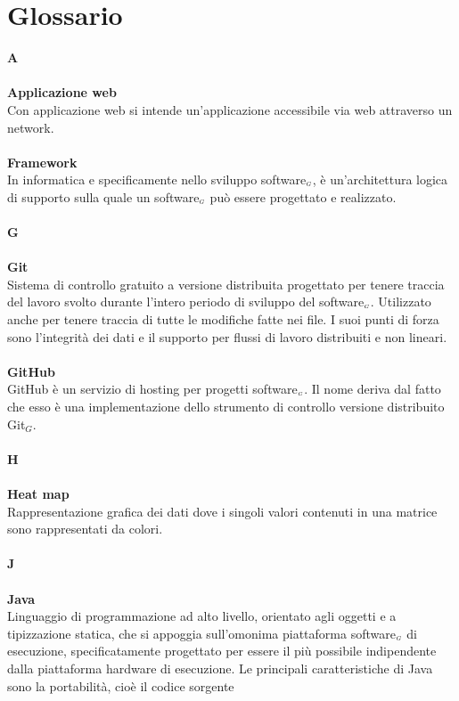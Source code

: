 \chapter{Glossario} \label{Glossario}
\textbf{A} \\
\\
\textbf{Applicazione web} \\
Con applicazione web si intende un'applicazione accessibile via web attraverso un network. \\
\\
\textbf{Framework} \\
In informatica e specificamente nello sviluppo software$_{\scaleto{G}{3pt}}$, è un'architettura logica di supporto sulla quale un software$_{\scaleto{G}{3pt}}$ può essere progettato e realizzato.\\
\\
\textbf{G} \\
\\
\textbf{Git}\\
Sistema di controllo gratuito a versione distribuita progettato per tenere traccia del lavoro svolto durante l'intero periodo di sviluppo del software$_{\scaleto{G}{3pt}}$.
Utilizzato anche per tenere traccia di tutte le modifiche fatte nei file.
I suoi punti di forza sono l'integrità dei dati e il supporto per flussi di lavoro distribuiti e non lineari.\\
\\
\textbf{GitHub} \\
GitHub è un servizio di hosting per progetti software$_{\scaleto{G}{3pt}}$. Il nome deriva dal fatto che esso è una implementazione dello strumento di controllo versione distribuito Git$_G$. \\
\\
\textbf{H} \\
\\
\textbf{Heat map} \\
 Rappresentazione grafica dei dati dove i singoli valori contenuti in una matrice sono rappresentati da colori. \\
\\
\textbf{J} \\
\\
\textbf{Java} \\
Linguaggio di programmazione ad alto livello, orientato agli oggetti e a tipizzazione statica, che si appoggia sull'omonima piattaforma software$_{\scaleto{G}{3pt}}$ di esecuzione, specificatamente progettato per essere il più possibile indipendente dalla piattaforma hardware di esecuzione. Le principali caratteristiche di Java sono la portabilità, cioè il codice sorgente
